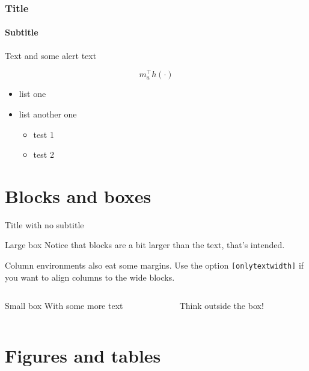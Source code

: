\begin{frame}

	\frametitle{Title}
	\framesubtitle{Subtitle}
	
	Text and some \alert{alert text}
	
	\[
	m_a^\top h(\cdot)
	\]
	
	
	\begin{itemize}
	\item list one
	\item list another one
		\begin{itemize}
		\item test 1
		\item test 2
		\end{itemize}
	\end{itemize}

\end{frame}

\section{Blocks and boxes}

\begin{frame}{Title with no subtitle}

	\begin{block}{Large box}
	Notice that blocks are a bit larger than the text, that's intended.
	\end{block}
	
	Column environments also eat some margins. Use the option \texttt{[onlytextwidth]} if you want to align columns to the wide blocks.
	
	\begin{columns}[onlytextwidth]
	\begin{column}{0.45\textwidth}
		\begin{block}{Small box}
		With some more text
		\end{block}
	\end{column}
	\begin{column}{0.5\textwidth}
		Think outside the box!
	\end{column}
	\end{columns}

\end{frame}

\section{Figures and tables}

